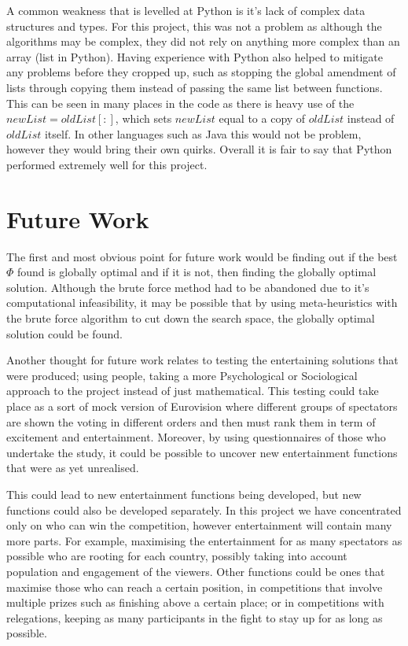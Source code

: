 \documentclass[12pt]{report}
\begin{document}
A common weakness that is levelled at Python is it's lack of complex data structures and types. For this project, this was not a problem as although the algorithms may be complex, they did not rely on anything more complex than an array (list in Python). Having experience with Python also helped to mitigate any problems before they cropped up, such as stopping the global amendment of lists through copying them instead of passing the same list between functions. This can be seen in many places in the code as there is heavy use of the $newList = oldList[:]$, which sets $newList$ equal to a copy of $oldList$ instead of $oldList$ itself. In other languages such as Java this would not be problem, however they would bring their own quirks. Overall it is fair to say that Python performed extremely well for this project.

\section{Future Work}\label{FutureWork}
The first and most obvious point for future work would be finding out if the best $\Phi$ found is globally optimal and if it is not, then finding the globally optimal solution. Although the brute force method had to be abandoned due to it's computational infeasibility, it may be possible that by using meta-heuristics with the brute force algorithm to cut down the search space, the globally optimal solution could be found.

Another thought for future work relates to testing the entertaining solutions that were produced; using people, taking a more Psychological or Sociological approach to the project instead of just mathematical. This testing could take place as a sort of mock version of Eurovision where different groups of spectators are shown the voting in different orders and then must rank them in term of excitement and entertainment. Moreover, by using questionnaires of those who undertake the study, it could be possible to uncover new entertainment functions that were as yet unrealised.

This could lead to new entertainment functions being developed, but new functions could also be developed separately. In this project we have concentrated only on who can win the competition, however entertainment will contain many more parts. For example, maximising the entertainment for as many spectators as possible who are rooting for each country, possibly taking into account population and engagement of the viewers. Other functions could be ones that maximise those who can reach a certain position, in competitions that involve multiple prizes such as finishing above a certain place; or in competitions with relegations, keeping as many participants in the fight to stay up for as long as possible.
\end{document}
